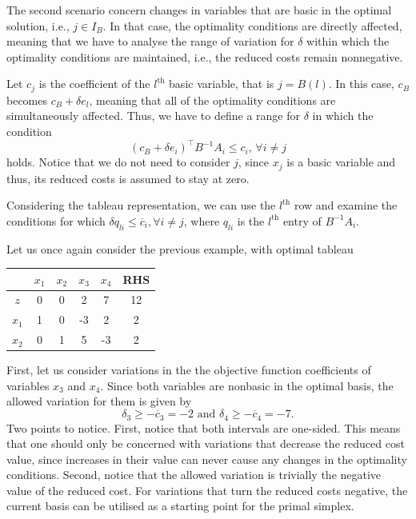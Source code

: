 The second scenario concern changes in variables that are basic in the optimal solution, i.e., $j \in I_B$. In that case, the optimality conditions are directly affected, meaning that we have to analyse the range of variation for $\delta$ within which the optimality conditions are maintained, i.e., the reduced costs remain nonnegative.

Let $c_j$ is the coefficient of the $l^{\text{th}}$ basic variable, that is $j = B(l)$. In this case, $c_B$ becomes $c_B + \delta e_l$, meaning that all of the optimality conditions are simultaneously affected. Thus, we have to define a range for $\delta$ in which the condition
%
\begin{equation*}
	(c_B + \delta e_i)^\top B^{-1}A_i \leq c_i, \, \forall i \neq j 
\end{equation*}
%
holds. Notice that we do not need to consider $j$, since $x_j$ is a basic variable and thus, its reduced costs is assumed to stay at zero.

Considering the tableau representation, we can use the $l^{\text{th}}$ row and examine the conditions for which $\delta q_{li} \leq \overline{c}_i, \forall i \neq j$, where $q_{li}$ is the $l^{\text{th}}$ entry of $B^{-1}A_i$.

Let us once again consider the previous example, with optimal tableau 

\begin{center}
	\begin{tabular}{c|cccc|c} 
	   &$x_1$ & $x_2$ & $x_3$ & $x_4$& RHS \\ \hline	
	   $z$ & 0 & 0 & 2 & 7 & 12\\
	   $x_1$ & 1 & 0 & -3 & 2 & 2\\
	   $x_2$ & 0 & 1 & 5 & -3 & 2\\	            
	\end{tabular}	
\end{center}

First, let us consider variations in the the objective function coefficients of variables $x_3$ and $x_4$. Since both variables are nonbasic in the optimal basis, the allowed variation for them is given by
%
\begin{equation*}
	\delta_3 \geq -\overline{c}_3 = -2 \text{ and } 
    \delta_4 \geq -\overline{c}_4 = -7. 	
\end{equation*}
%
Two points to notice. First, notice that both intervals are one-sided. This means that one should only be concerned with variations that decrease the reduced cost value, since increases in their value can never cause any changes in the optimality conditions. Second, notice that the allowed variation is trivially the negative value of the reduced cost. For variations that turn the reduced costs negative, the current basis can be utilised as a starting point for the primal simplex.


